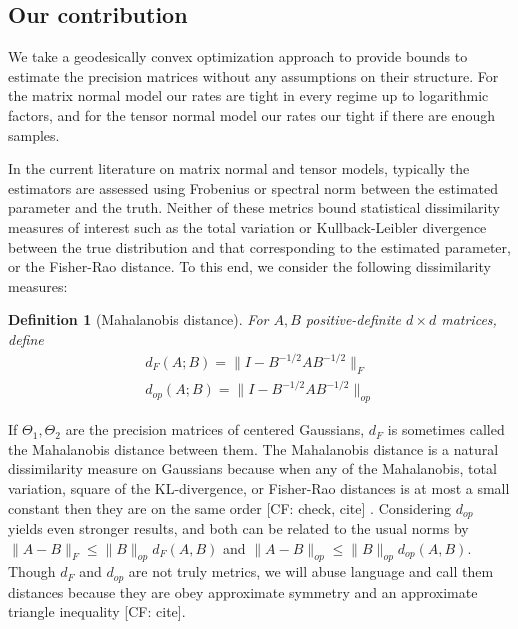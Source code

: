 \documentclass{article}
\newtheorem{definition}{Definition}
\newcommand{\CF}[1]{{\color{purple}[CF: #1]}}
\begin{document}
\subsection{Our contribution}

We take a geodesically convex optimization approach to provide bounds to estimate the precision matrices without any assumptions on their structure. For the matrix normal model our rates are tight in every regime up to logarithmic factors, and for the tensor normal model our rates our tight if there are enough samples.

In the current literature on matrix normal and tensor models, typically the estimators are assessed using Frobenius or spectral norm between the estimated parameter and the truth. Neither of these metrics bound statistical dissimilarity measures of interest such as the total variation or Kullback-Leibler divergence between the true distribution and that corresponding to the estimated parameter, or the Fisher-Rao distance. To this end, we consider the following dissimilarity measures:
\begin{definition}[Mahalanobis distance]
For $A,B$ positive-definite $d\times d$ matrices, define
\begin{align}d_{F}(A; B) = \| I - B^{-1/2} A B^{-1/2}\|_F\\
d_{op}(A; B) = \| I - B^{-1/2} A B^{-1/2}\|_{op}
\end{align}
\end{definition}
If $\Theta_1, \Theta_2$ are the precision matrices of centered Gaussians, $d_F$ is sometimes called the Mahalanobis distance between them. The Mahalanobis distance is a natural dissimilarity measure on Gaussians because when any of the Mahalanobis, total variation, square of the KL-divergence, or Fisher-Rao distances is at most a small constant then they are on the same order \CF{check, cite} \cite{barsov1987}. Considering $d_{op}$ yields even stronger results, and both can be related to the usual norms by $\|A - B\|_F \leq \|B\|_{op} d_F(A,B)$ and $\|A  - B\|_{op} \leq \|B\|_{op} d_{op}(A,B)$. Though $d_F$ and $d_{op}$ are not truly metrics, we will abuse language and call them distances because they are obey approximate symmetry and an approximate triangle inequality \CF{cite}.
\end{document}
